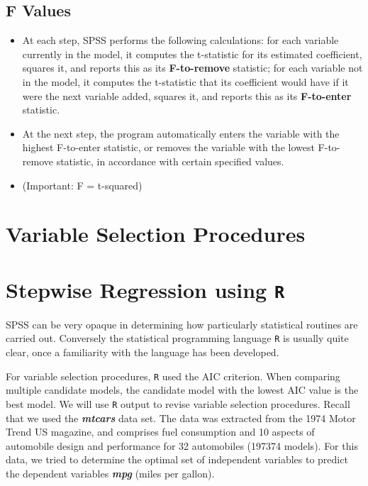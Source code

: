 \documentclass[a4paper,12pt]{article}
\begin{document}
\subsection{F Values}
\begin{itemize}
	\item At each step, SPSS performs the following calculations: for each variable currently in the model, it computes the t-statistic for its estimated coefficient, squares it, and reports this as its \textbf{F-to-remove} statistic; for each variable not in the model, it computes the t-statistic that its coefficient would have if it were the next variable added, squares it, and reports this as its \textbf{F-to-enter} statistic.
	
\item 	At the next step, the program automatically enters the variable with the highest F-to-enter statistic, or removes the variable with the lowest F-to-remove statistic, in accordance with certain specified values. 
	
\item 	(Important: F = t-squared)
\end{itemize}


\newpage
\section{Variable Selection Procedures}




\section{Stepwise Regression using \texttt{R}}

SPSS can be very opaque in determining how particularly statistical routines are carried out. Conversely the statistical programming language \texttt{R} is usually quite clear, once a familiarity with the language has been developed.

For variable selection procedures, \texttt{R} used the AIC criterion. When comparing multiple candidate models, the candidate model with the lowest AIC value is the best model. We will use \texttt{R} output to revise variable selection procedures. Recall that we used the \textbf{\textit{mtcars}} data set. The data was extracted from the 1974 Motor Trend US magazine, and comprises fuel consumption and 10 aspects of automobile design and performance for 32 automobiles (197374 models). For this data, we tried to determine the optimal set of independent variables to predict the dependent variables \textbf{\textit{mpg}} (miles per gallon).
\end{document}
